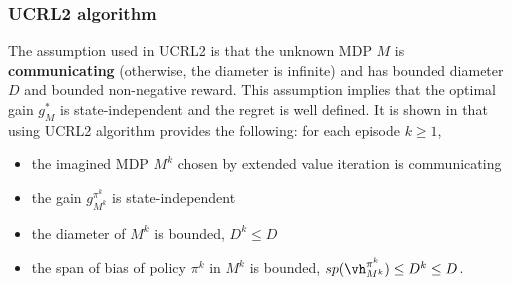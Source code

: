 \subsubsection{UCRL2 algorithm}

The assumption used in UCRL2 is that the unknown MDP $M$ is \textbf{communicating} (otherwise, the diameter is infinite) and has bounded diameter $D$ and bounded non-negative reward.
This assumption implies that the optimal gain $g^*_M$ is state-independent and the regret is well defined.
It is shown in \cite{jaksch2010near} that using UCRL2 algorithm provides the following: for each episode $k\ge1$,
\begin{itemize}
    \item the imagined MDP $M^k$ chosen by extended value iteration is communicating
    \item the gain $g^{\pi^k}_{M^k}$ is state-independent
    \item the diameter of $M^k$ is bounded, $D^k\le D$
    \item the span of bias of policy $\pi^k$ in $M^k$ is bounded, $sp(\vh^{\pi^k}_{M^k})\le D^k\le D$.
\end{itemize}


